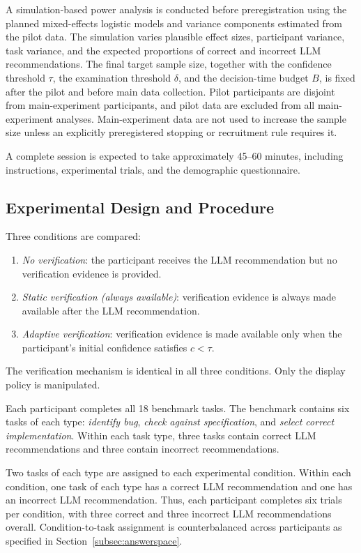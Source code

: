 \documentclass[oneside,final,14pt,a4paper]{extreport}
\begin{document}
A simulation-based power analysis is conducted before preregistration using
the planned mixed-effects logistic models and variance components estimated
from the pilot data. The simulation varies plausible effect sizes, participant
variance, task variance, and the expected proportions of correct and incorrect
LLM recommendations. The final target sample size, together with the
confidence threshold $\tau$, the examination threshold $\delta$, and the
decision-time budget $B$, is fixed after the pilot and before main data
collection. Pilot participants are disjoint from main-experiment
participants, and pilot data are excluded from all main-experiment analyses.
Main-experiment data are not used to increase the sample size unless an
explicitly preregistered stopping or recruitment rule requires it.

A complete session is expected to take approximately 45--60 minutes,
including instructions, experimental trials, and the demographic
questionnaire.

\subsection{Experimental Design and Procedure}
\label{subsec:procedure}
Three conditions are compared:

\begin{enumerate}
\item \emph{No verification}: the participant receives the LLM recommendation
but no verification evidence is provided.
\item \emph{Static verification (always available)}: verification evidence is
always made available after the LLM recommendation.
\item \emph{Adaptive verification}: verification evidence is made available
only when the participant's initial confidence satisfies $c<\tau$.
\end{enumerate}

The verification mechanism is identical in all three conditions. Only the
display policy is manipulated.

Each participant completes all 18 benchmark tasks. The benchmark contains six
tasks of each type: \emph{identify bug}, \emph{check against specification},
and \emph{select correct implementation}. Within each task type, three tasks
contain correct LLM recommendations and three contain incorrect
recommendations.

Two tasks of each type are assigned to each experimental condition. Within
each condition, one task of each type has a correct LLM recommendation and one
has an incorrect LLM recommendation. Thus, each participant completes six
trials per condition, with three correct and three incorrect LLM
recommendations overall. Condition-to-task assignment is counterbalanced
across participants as specified in Section~\ref{subsec:answerspace}.
\end{document}
